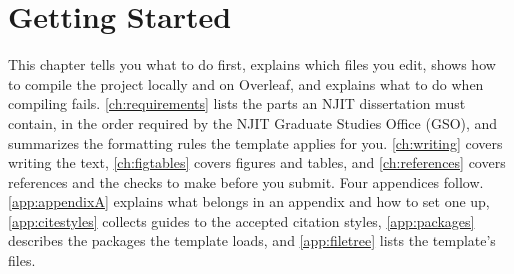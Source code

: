 %

\chapter{Getting Started}
\label{ch:start}

This chapter tells you what to do first, explains which files you edit, shows how to compile the project locally and on Overleaf, and explains what to do when compiling fails. \cref{ch:requirements} lists the parts an NJIT dissertation must contain, in the order required by the NJIT Graduate Studies Office (GSO), and summarizes the formatting rules the template applies for you. \cref{ch:writing} covers writing the text, \cref{ch:figtables} covers figures and tables, and \cref{ch:references} covers references and the checks to make before you submit. Four appendices follow. \cref{app:appendixA} explains what belongs in an appendix and how to set one up, \cref{app:citestyles} collects guides to the accepted citation styles, \cref{app:packages} describes the packages the template loads, and \cref{app:filetree} lists the template's files.

